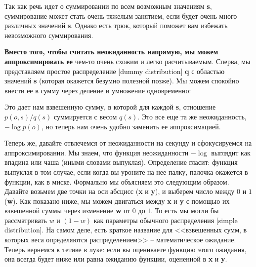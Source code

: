 \documentclass[twoside,leqno, 11pt]{article}
\begin{document}
	Так как речь идет о суммировании по всем возможным значениям \textbf{s}, суммирование может стать очень тяжелым занятием, если будет очень много различных значений \textbf{s}. Однако есть трюк, который поможет вам избежать невозможного суммирования.
	
	\textbf{Вместо того, чтобы считать неожиданность напрямую, мы можем аппроксимировать ее} чем-то очень схожим и легко расчитываемым. Сперва, мы представляем простое распределение [dummy distribution] \textbf{q} с областью значений \textbf{s} (которая окажется безумно полезной позже). Мы можем спокойно внести ее в сумму через деление и умножение одновременно: 
	
	\begin{figure}[h!]
		\label{ris:image}
	\end{figure}
	
	Это дает нам взвешенную сумму, в которой для каждой \textbf{s}, отношение $p(o, s)/q(s)$ суммируется с весом $q(s)$. Это все еще та же неожиданность, $-\log p(o)$, но теперь нам очень удобно заменить ее аппроксимацией.
	
	Теперь же, давайте отвлечемся от неожиданности на секунду и сфокусируемся на аппроксимировании. Мы знаем, что функция неожиданности $-\log$ выглядит как впадина или чаша (иными словами выпуклая). Определение гласит: функция выпуклая в том случае, если когда вы уроните на нее палку, палочка окажется в функции, как в миске. Формально мы объясняем это следующим образом. Давайте возьмем две точки на оси абсцисс (\textbf{x} и \textbf{y}), и выберем число между $0$ и $1$ (\textbf{w}). Как показано ниже, мы можем двигаться между \textbf{x} и \textbf{y} с помощью их взвешенной суммы через изменение \textbf{w} от $0$ до $1$. То есть мы могли бы рассматривать $w$ и $(1 - w)$ как параметры обычного распределения [simple distribution]. На самом деле, есть краткое название для <<взвешенных сумм, в которых веса определяются распределением>> -- математическое ожидание. Теперь вернемся к тетиве в луке: если вы оцениваете функцию этого ожидания, она всегда будет ниже или равна ожиданию функции, оцененной в \textbf{x} и \textbf{y}.
	
	\begin{figure}[h]
		\label{ris:image}
	\end{figure}
	
\end{document}
